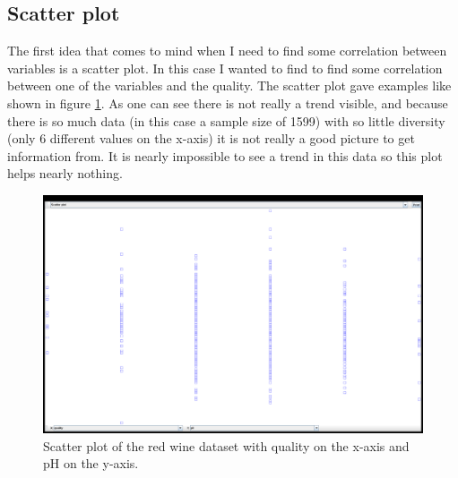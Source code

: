 \documentclass[a4paper,twoside,11pt]{article}
\begin{document}
\subsection{Scatter plot}
The first idea that comes to mind when I need to find some correlation between variables is a scatter plot. In this case I wanted to find to find some correlation between one of the variables and the quality. The scatter plot gave examples like shown in figure \ref{SP}. As one can see there is not really a trend visible, and because there is so much data (in this case a sample size of 1599) with so little diversity (only 6 different values on the x-axis) it is not really a good picture to get information from. It is nearly impossible to see a trend in this data so this plot helps nearly nothing.
\begin{figure}[!h]
  \centering
  \includegraphics[width=\textwidth]{20131105023902plot.png}
  \caption{Scatter plot of the red wine dataset with quality on the x-axis and pH on the y-axis.}
  \label{SP}
\end{figure}
\end{document}
